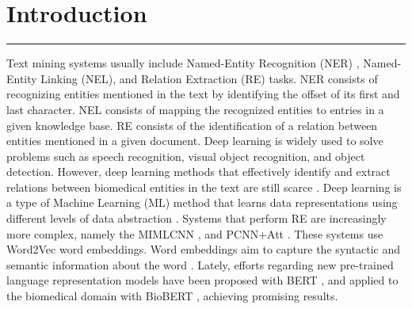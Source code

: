 \hypertarget{1}{}

\chapter{Introduction}


\vspace{-1.6cm}

\begingroup
\color{gray}
\par\noindent\rule{\textwidth}{0.4pt}
\endgroup


Text mining systems usually include Named-Entity Recognition (NER) \citep{notaro2017prediction}, Named-Entity Linking (NEL), and Relation Extraction (RE) tasks. NER consists of recognizing entities mentioned in the text by identifying the offset of its first and last character. NEL consists of mapping the recognized entities to entries in a given knowledge base. RE consists of the identification of a relation between entities mentioned in a given document. Deep learning is widely used to solve problems such as speech recognition, visual object recognition, and object detection. However, deep learning methods that effectively identify and extract relations between biomedical entities in the text are still scarce \citep{li2017neural}. Deep learning is a type of Machine Learning (ML) method that learns data representations using different levels of data abstraction \citep{lecun2015deep}. Systems that perform RE are increasingly more complex, namely the MIMLCNN \citep{jiang2016relation}, and PCNN+Att \citep{lin2016neural}. These systems use Word2Vec \citep{mikolov2013distributed} word embeddings. Word embeddings aim to capture the syntactic and semantic information about the word \citep{kumar2017survey}. Lately, efforts regarding new pre-trained language representation models have been proposed with BERT \citep{vaswani2017attention,devlin2019bert}, and applied to the biomedical domain with BioBERT \citep{lee2020biobert}, achieving promising results.

